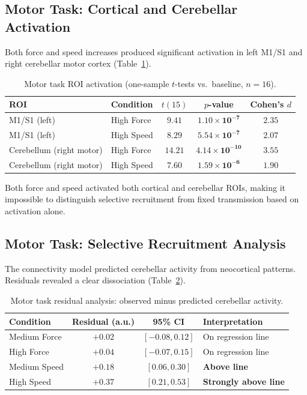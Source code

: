 \documentclass[11pt]{article}
\begin{document}
\subsection{Motor Task: Cortical and Cerebellar Activation}

Both force and speed increases produced significant activation in left M1/S1 and right cerebellar motor cortex (Table~\ref{tab:motor_activation}).

\begin{table}[H]
\centering
\caption{Motor task ROI activation (one-sample $t$-tests vs.\ baseline, $n = 16$).}
\label{tab:motor_activation}
\begin{tabular}{@{}llccc@{}}
\toprule
ROI & Condition & $t(15)$ & $p$-value & Cohen's $d$ \\
\midrule
M1/S1 (left) & High Force & $9.41$ & $\mathbf{1.10 \times 10^{-7}}$ & $2.35$ \\
M1/S1 (left) & High Speed & $8.29$ & $\mathbf{5.54 \times 10^{-7}}$ & $2.07$ \\
Cerebellum (right motor) & High Force & $14.21$ & $\mathbf{4.14 \times 10^{-10}}$ & $3.55$ \\
Cerebellum (right motor) & High Speed & $7.60$ & $\mathbf{1.59 \times 10^{-6}}$ & $1.90$ \\
\bottomrule
\end{tabular}
\end{table}

Both force and speed activated both cortical and cerebellar ROIs, making it impossible to distinguish selective recruitment from fixed transmission based on activation alone.

\subsection{Motor Task: Selective Recruitment Analysis}

The connectivity model predicted cerebellar activity from neocortical patterns. Residuals revealed a clear dissociation (Table~\ref{tab:motor_residuals}).

\begin{table}[H]
\centering
\caption{Motor task residual analysis: observed minus predicted cerebellar activity.}
\label{tab:motor_residuals}
\begin{tabular}{@{}lccl@{}}
\toprule
Condition & Residual (a.u.) & 95\% CI & Interpretation \\
\midrule
Medium Force & $+0.02$ & $[-0.08, 0.12]$ & On regression line \\
High Force & $+0.04$ & $[-0.07, 0.15]$ & On regression line \\
Medium Speed & $+0.18$ & $[0.06, 0.30]$ & \textbf{Above line} \\
High Speed & $+0.37$ & $[0.21, 0.53]$ & \textbf{Strongly above line} \\
\bottomrule
\end{tabular}
\end{table}
\end{document}
